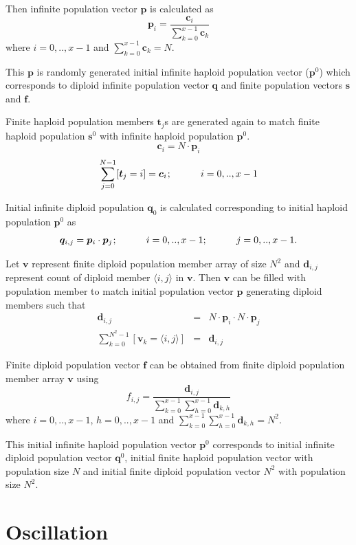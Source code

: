 Then infinite population vector $\bm{p}$ is calculated as
\[
\bm{p}_i = \frac{\bm{c}_i}{ \sum \limits_{k=0}^{x-1} \bm{c}_k }
\]
where $i = 0,.., x-1$ and $\sum \limits_{k=0}^{x-1} \bm{c}_k = N$.

This $\bm{p}$ is randomly generated initial infinite haploid population vector ($\bm{p}^0$) which corresponds to diploid infinite population vector $\bm{q}$ 
and finite population vectors $\bm{s}$ and $\bm{f}$.

Finite haploid population members $\bm{t}_j$s are generated again to match finite haploid population $\bm{s}^0$ with infinite haploid population $\bm{p}^0$.
\[
\bm{c}_i = N \cdot \bm{p}_i 
\]
\[
\sum \limits_{j=0}^{N-1} [\bm{t}_j = i] = \bm{c}_i  \hspace{0.01in}; \hspace{30pt}  {i = 0,.., x-1} 
\]

Initial infinite diploid population $\bm{q}_0$ is calculated corresponding to initial haploid population $\bm{p}^0$ as
\[
\bm{q}_{i,j} = \bm{p}_i \cdot \bm{p}_j  \hspace{0.01in}; \hspace{30pt}  {i = 0,..,x-1; \hspace{30pt}j = 0,..,x-1}.
\]

Let $\bm{v}$ represent finite diploid population member array of size $N^2$ and $\bm{d}_{i,j}$ represent count of 
diploid member $\langle i,j \rangle$ in $\bm{v}$. Then $\bm{v}$ can be filled with population member to match 
initial population vector $\bm{p}$ generating diploid members such that
\begin{eqnarray*}
\bm{d}_{i,j} & = & N \cdot \bm{p}_i \cdot N \cdot \bm{p}_j  \\
\sum \limits_{k=0}^{N^2-1} [ \bm{v}_k = \langle i,j \rangle ] & = & \bm{d}_{i,j}
\end{eqnarray*}

Finite diploid population vector $\bm{f}$ can be obtained from finite diploid population member array $\bm{v}$  using
\[
f_{i,j} = \frac{\bm{d}_{i,j}}{\sum \limits_{k=0}^{x-1} \sum \limits_{h=0}^{x-1} \bm{d}_{k,h}}
\]
where $i = 0,.., x-1$, $h = 0,.., x-1$ and $\sum \limits_{k=0}^{x-1} \sum \limits_{h=0}^{x-1} \bm{d}_{k,h} = N^2$.

This initial infinite haploid population vector $\bm{p}^0$ corresponds to initial infinite diploid population vector $\bm{q}^0$, initial finite 
haploid population vector with population size $N$ and initial finite diploid population vector $N^2$ with population size $N^2$.

\section{Oscillation}
\label{Oscillation}

